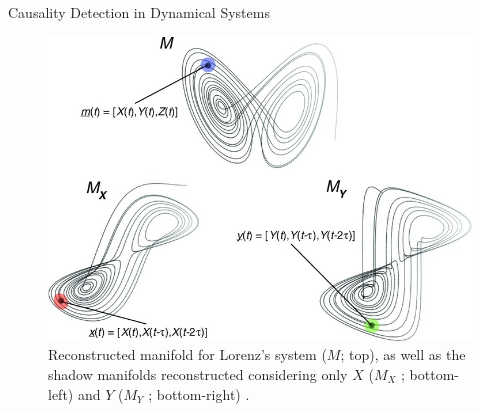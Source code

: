 \documentclass[final]{beamer}
\begin{document}
\begin{frame}{}
\begin{textblock}{22}
\begin{block}{Causality Detection in Dynamical Systems}
\begin{figure}
\includegraphics[width=14cm]{lorenz2.jpg}
\hspace{0.5em}
\hspace{0.5em}
\caption{Reconstructed manifold for Lorenz’s system ($M$; top), as well as the shadow manifolds reconstructed considering only $X$ ($M_X$ ; bottom-left) and $Y$ ($M_Y$ ; bottom-right) \cite{Sugihara12}.}
\label{fig:lorenz}
\end{figure}
\vspace{-1.5cm}

\end{block}
\end{textblock}
\end{frame}
\end{document}
